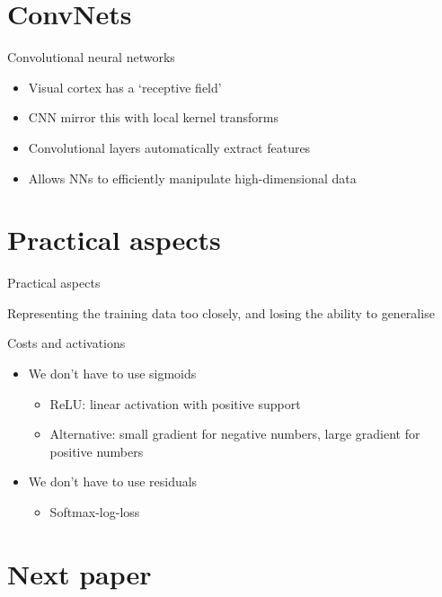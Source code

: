 \documentclass[presentation]{beamer}
\begin{document}
\section{ConvNets}
\label{sec:org19e83bf}
\begin{frame}[label={sec:org079c9bb}]{Convolutional neural networks}
\begin{itemize}
\item Visual cortex has a `receptive field'
\item CNN mirror this with local kernel transforms
\item Convolutional layers automatically extract features
\item Allows NNs to efficiently manipulate high-dimensional data
\end{itemize}
\end{frame}

\section{Practical aspects}
\label{sec:org1ab8d8e}
\begin{frame}[label={sec:org4736d7e}]{Practical aspects}
\begin{definition}[Overfitting]
Representing the training data too closely, and losing the ability to generalise
\end{definition}
\end{frame}

\begin{frame}[<+->][label={sec:org87d9b57}]{Costs and activations}
\begin{itemize}
\item We don't have to use sigmoids
\begin{itemize}
\item ReLU: linear activation with positive support
\item Alternative: small gradient for negative numbers, large gradient for positive numbers
\end{itemize}
\item We don't have to use residuals
\begin{itemize}
\item Softmax-log-loss
\end{itemize}
\end{itemize}
\end{frame}

\section{Next paper}
\label{sec:org1871240}
\end{document}
